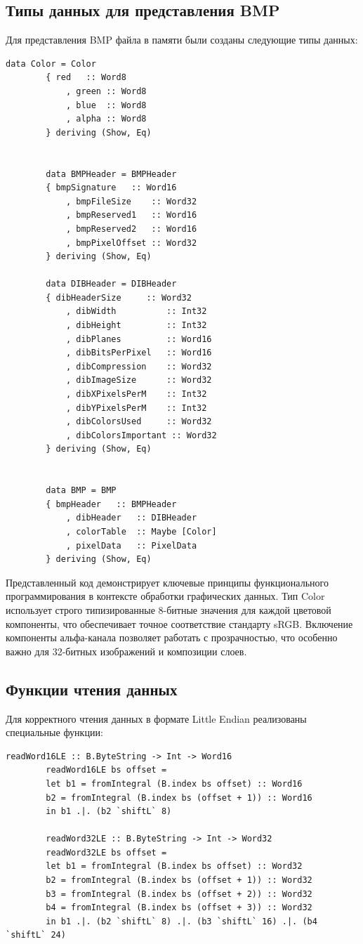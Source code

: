 \documentclass[a4paper,12pt]{article}
\begin{document}
	\subsection{Типы данных для представления BMP}
	
	Для представления BMP файла в памяти были созданы следующие типы данных:
	
	\begin{lstlisting}[caption=Основные типы данных для работы с BMP, label=lst:bmp-types]
		data Color = Color
		{ red   :: Word8
			, green :: Word8
			, blue  :: Word8
			, alpha :: Word8  
		} deriving (Show, Eq)
		

		data BMPHeader = BMPHeader
		{ bmpSignature   :: Word16  
			, bmpFileSize    :: Word32
			, bmpReserved1   :: Word16
			, bmpReserved2   :: Word16
			, bmpPixelOffset :: Word32  
		} deriving (Show, Eq)
		
		data DIBHeader = DIBHeader
		{ dibHeaderSize     :: Word32 
			, dibWidth          :: Int32  
			, dibHeight         :: Int32  
			, dibPlanes         :: Word16 
			, dibBitsPerPixel   :: Word16 
			, dibCompression    :: Word32 
			, dibImageSize      :: Word32 
			, dibXPixelsPerM    :: Int32   
			, dibYPixelsPerM    :: Int32  
			, dibColorsUsed     :: Word32  
			, dibColorsImportant :: Word32 
		} deriving (Show, Eq)
		

		data BMP = BMP
		{ bmpHeader   :: BMPHeader
			, dibHeader   :: DIBHeader
			, colorTable  :: Maybe [Color]  
			, pixelData   :: PixelData
		} deriving (Show, Eq)
	\end{lstlisting}
	
	Представленный код демонстрирует ключевые принципы функционального программирования в контексте обработки графических данных. Тип Color использует строго типизированные 8-битные значения для каждой цветовой компоненты, что обеспечивает точное соответствие стандарту sRGB. Включение компоненты альфа-канала позволяет работать с прозрачностью, что особенно важно для 32-битных изображений и композиции слоев.
	
	\subsection{Функции чтения данных}
	
	Для корректного чтения данных в формате Little Endian реализованы специальные функции:
	
	\begin{lstlisting}[caption=Функции чтения Little Endian, label=lst:read-le]
		readWord16LE :: B.ByteString -> Int -> Word16
		readWord16LE bs offset =
		let b1 = fromIntegral (B.index bs offset) :: Word16
		b2 = fromIntegral (B.index bs (offset + 1)) :: Word16
		in b1 .|. (b2 `shiftL` 8)
		
		readWord32LE :: B.ByteString -> Int -> Word32
		readWord32LE bs offset =
		let b1 = fromIntegral (B.index bs offset) :: Word32
		b2 = fromIntegral (B.index bs (offset + 1)) :: Word32
		b3 = fromIntegral (B.index bs (offset + 2)) :: Word32
		b4 = fromIntegral (B.index bs (offset + 3)) :: Word32
		in b1 .|. (b2 `shiftL` 8) .|. (b3 `shiftL` 16) .|. (b4 `shiftL` 24)
	\end{lstlisting}
	
\end{document}

